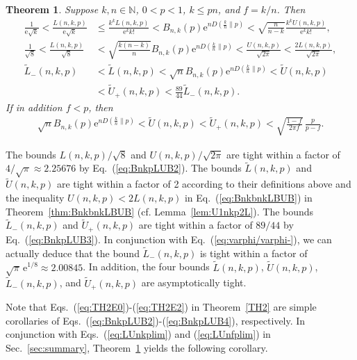 \documentclass[aop]{imsart}
\theoremstyle{plain}
\newtheorem{theorem}{Theorem}[section]
\theoremstyle{remark}
\newcommand{\rme}{\mathrm{e}}
\newcommand{\bbN}{\mathbb{N}}
\newcommand{\1}{\operatorname{\uppercase\expandafter{\romannumeral1}}}
\newcommand{\2}{\operatorname{\uppercase\expandafter{\romannumeral2}}}
\newcommand{\3}{\operatorname{\uppercase\expandafter{\romannumeral3}}}
\newcommand{\4}{\operatorname{\uppercase\expandafter{\romannumeral4}}}
\newcommand{\5}{\operatorname{\uppercase\expandafter{\romannumeral5}}}
\newcommand{\6}{\operatorname{\uppercase\expandafter{\romannumeral6}}}
\newcommand{\7}{\operatorname{\uppercase\expandafter{\romannumeral7}}}
\newcommand{\8}{\operatorname{\uppercase\expandafter{\romannumeral8}}}
\newcommand{\9}{\operatorname{\uppercase\expandafter{\romannumeral9}}}
\def\eqref#1{\textup{(\ref{#1})}}
\newcommand{\eref}[1]{Eq.~\textup{(\ref{#1})}}
\newcommand{\eqsref}[2]{Eqs.~(\ref{#1}) and (\ref{#2})}
\newcommand{\thref}[1]{Theorem~\ref{#1}}
\newcommand{\lref}[1]{Lemma~\ref{#1}}
\newcommand{\sref}[1]{Sec.~\ref{#1}}
\begin{document}
\begin{theorem}\label{thm:TailBound}
	Suppose  $k,n\in \bbN$,   $0<p<1$, $k\leq pn$, and  $f=k/n$. Then 
	\begin{align}
	\frac{1}{\rme \sqrt{k}} <	\frac{L(n,k,p)}{\rme \sqrt{k}}& \leq \frac{k^kL(n,k,p)}{\rme^k k!}< B_{n,k}(p) \rme^{nD(\frac{k}{n}\| p)}< \sqrt{\frac{n}{n-k}}\frac{k^kU(n,k,p)}{\rme^k k!},	\label{eq:BnkpLUB1} 	\\[1ex] 
	\frac{1}{\sqrt{8}}< \frac{L(n,k,p)}{\sqrt{8}}  &< \sqrt{\frac{k(n-k)}{n}}B_{n,k}(p)\rme^{nD(\frac{k}{n}\| p)}	< \frac{U(n,k,p)}{\sqrt{2\pi}} < \frac{2L(n,k,p)}{\sqrt{2\pi }},  \label{eq:BnkpLUB2} \\
	\tilde{L}_-(n,k,p)&< \tilde{L}(n,k,p)
<\sqrt{n} B_{n,k}(p) \rme^{nD(\frac{k}{n}\| p)}	< \tilde{U}(n,k,p)  \label{eq:BnkpLUB3}\\  
&
< \tilde{U}_+(n,k,p) < \frac{89}{44}	\tilde{L}_-(n,k,p). \nonumber
\end{align}
If in addition  $f<p$, then 
\begin{gather}	
\sqrt{n} B_{n,k}(p) \rme^{nD(\frac{k}{n}\| p)}	<\tilde{U}(n,k,p)< \tilde{U}_+(n,k,p)< 	
	\sqrt{\frac{1-f}{2\pi f}}\,\frac{p}{p-f}. \label{eq:BnkpLUB4}
	\end{gather}
\end{theorem}
The  bounds $L(n,k,p)/\sqrt{8}$ and $U(n,k,p)/\sqrt{2\pi}$   are tight within a factor of $4/\sqrt{\pi}\approx 2.25676$ 
by \eref{eq:BnkpLUB2}. The bounds $\tilde{L}(n,k,p)$ and  $\tilde{U}(n,k,p)$ are tight within  a factor of 2 according to their definitions above and the inequality $U(n,k,p)< 2L(n,k,p)$ in 
\eref{eq:BnkbnkLBUB} in \thref{thm:BnkbnkLBUB} (cf. \lref{lem:U1nkp2L}). The  bounds $\tilde{L}_-(n,k,p)$ and $\tilde{U}_+(n,k,p)$ are tight within  a factor of $89/44$ by \eref{eq:BnkpLUB3}. In conjunction with \eref{eq:varphi/varphi-}, we can actually deduce that the  bound $\tilde{L}_-(n,k,p)$ is  tight within  a factor of $\sqrt{\pi}\,\rme^{1/8}\approx 2.00845$. In addition, the four bounds $\tilde{L}(n,k,p)$, $\tilde{U}(n,k,p)$,  $\tilde{L}_-(n,k,p)$,  and $\tilde{U}_+(n,k,p)$
 are  asymptotically tight. 




Note that Eqs.~\eqref{eq:TH2E0}-\eqref{eq:TH2E2} in  \thref{TH2} are simple corollaries  of Eqs.~\eqref{eq:BnkpLUB2}-\eqref{eq:BnkpLUB4}, respectively.  In conjunction with \eqsref{eq:LUnkplim}{eq:LUnfplim} in \sref{sec:summary}, \thref{thm:TailBound} yields the following corollary. 
\end{document}
